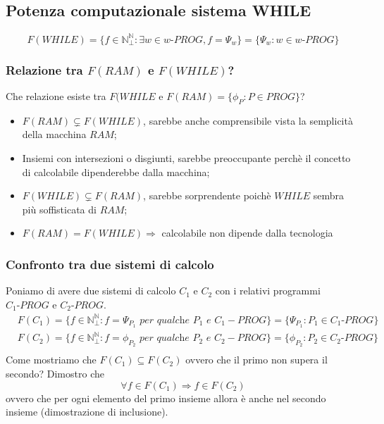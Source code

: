 \documentclass{article}
\begin{document}
\subsection{Potenza computazionale sistema WHILE}
\begin{displaymath}
	F(WHILE)=\{ f \in \mathbb{N}_{\perp}^{\mathbb{N}}: \exists w \in w\textit{-PROG}, f= \Psi_w \} = \{ \Psi_w: w \in w\textit{-PROG} \}
\end{displaymath}
\subsubsection{Relazione tra $F(RAM)$ e $F(WHILE)$?}
Che relazione esiste tra $F(WHILE$ e $F(RAM)=\{ \phi_P:P \in \textit{PROG} \} $?
\begin{itemize}
	\item $F(RAM) \subsetneq F(WHILE)$, sarebbe anche comprensibile vista la semplicità della macchina $RAM$;
	\item Insiemi con intersezioni o disgiunti, sarebbe preoccupante perchè il concetto di calcolabile dipenderebbe dalla macchina;
	\item $F(WHILE) \subsetneq F(RAM)$, sarebbe sorprendente poichè $WHILE$ sembra più soffisticata di $RAM$;
	\item $F(RAM) = F(WHILE) \Rightarrow$ calcolabile non dipende dalla tecnologia
\end{itemize}
\subsubsection{Confronto tra due sistemi di calcolo}
Poniamo di avere due sistemi di calcolo $C_1$ e $C_2$ con i relativi programmi $C_1\textit{-PROG}$ e $C_2\textit{-PROG}$. 
\begin{displaymath}
	\begin{split}
		& F(C_1) = \{ f \in \mathbb{N}_{\perp}^{\mathbb{N}}: f= \Psi_{P_1} \textit{ per qualche $P_1$ e $C_1$}-PROG \} = \{ \Psi_{P_1} : P_1 \in C_1\textit{-PROG} \} \\
		& F(C_2) = \{ f \in \mathbb{N}_{\perp}^{\mathbb{N}}: f= \phi_{P_2} \textit{ per qualche $P_2$ e $C_2$}-PROG \} = \{ \phi_{P_2} : P_2 \in C_2\textit{-PROG} \} \\
	\end{split}
\end{displaymath}
Come mostriamo che $F(C_1) \subseteq F(C_2)$ ovvero che il primo non supera il secondo? Dimostro che 
\begin{displaymath}
	\forall f \in F(C_1) \Rightarrow f \in F(C_2)
\end{displaymath}
ovvero che per ogni elemento del primo insieme allora è anche nel secondo insieme (dimostrazione di inclusione).
\end{document}
